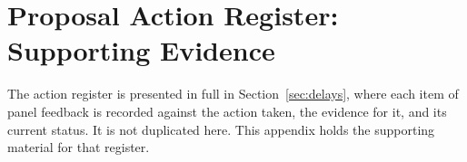 \chapter{Proposal Action Register: Supporting Evidence}
The action register is presented in full in Section~\ref{sec:delays}, where each item of panel
feedback is recorded against the action taken, the evidence for it, and its current
status. It is not duplicated here. This appendix holds the supporting material for
that register.

